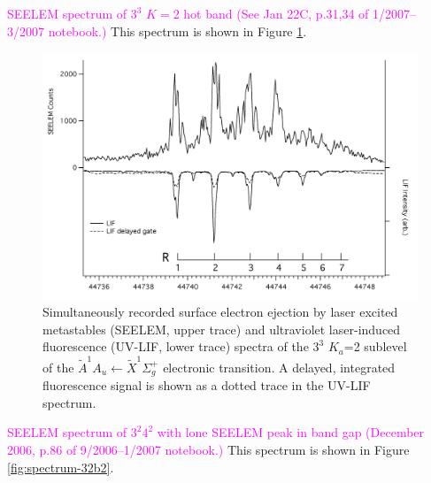 \documentclass[12pt]{mitthesis}
\newcommand{\POINT}[1]{\textcolor{magenta}{#1}}
\begin{document}
\POINT{SEELEM spectrum of $3^3$ $K=2$ hot band (See Jan 22C, p.31,34
  of 1/2007--3/2007 notebook.)}  This spectrum is shown in Figure
\ref{fig:spectrum-33k2}.

\begin{figure}
  \caption{
    Simultaneously recorded surface electron ejection by laser excited
    metastables (SEELEM, upper trace) and ultraviolet laser-induced
    fluorescence (UV-LIF, lower trace) spectra of the $3^3$ $K_a$=2
    sublevel of the $\tilde{A}^1A_u \leftarrow \tilde{X} ^1\Sigma_g^+$
    electronic transition. A delayed, integrated fluorescence signal
    is shown as a dotted trace in the UV-LIF spectrum.}
  \label{fig:spectrum-33k2}
  \centering
  \includegraphics[width=8in,angle=90]{spectrum-33k2.png}
\end{figure}

\POINT{SEELEM spectrum of $3^2 4^2$ with lone SEELEM peak in band gap
  (December 2006, p.86 of 9/2006--1/2007 notebook.)}  This spectrum is
shown in Figure \ref{fig:spectrum-32b2}.
\end{document}

